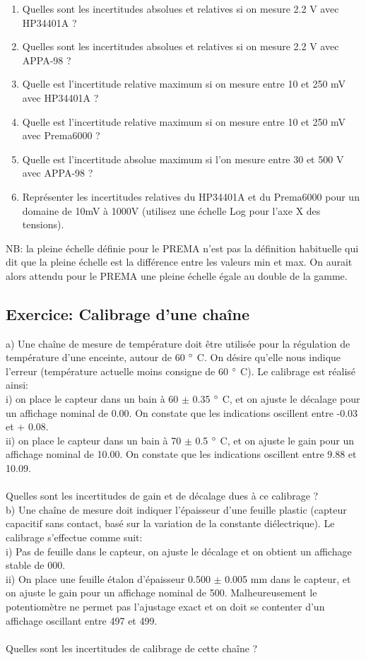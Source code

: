 \begin{enumerate}
\item Quelles sont les incertitudes absolues et relatives si on mesure 2.2 V avec HP34401A ?
\item Quelles sont les incertitudes absolues et relatives si on mesure 2.2 V avec APPA-98 ?
\item Quelle est l'incertitude relative maximum si on mesure entre 10 et 250 mV avec HP34401A ?
\item Quelle est l'incertitude relative maximum si on mesure entre 10 et 250 mV avec Prema6000 ?
\item Quelle est l'incertitude absolue maximum si l'on mesure entre 30 et 500 V avec APPA-98 ?
\item Représenter les incertitudes relatives du HP34401A et du Prema6000 pour un domaine de 10mV à 1000V (utilisez une échelle Log pour l'axe X des tensions).
\end{enumerate}
NB: la pleine échelle définie pour le PREMA n'est pas la définition habituelle qui dit que la pleine échelle est la différence entre les valeurs min et max. On aurait alors attendu pour le PREMA une pleine échelle égale au double de la gamme.

\subsection{Exercice: Calibrage d'une chaîne}
a)	Une chaîne de mesure de température doit être utilisée pour la régulation de température d'une enceinte, autour de 60 $\degree$ C. On désire qu'elle nous indique l'erreur (température actuelle moins consigne de 60 $\degree$ C). Le calibrage est réalisé ainsi: \\
i)	on place le capteur dans un bain à 60 $\pm$ 0.35 $\degree$ C, et on ajuste le décalage pour un affichage nominal de 0.00. On constate que les indications oscillent entre -0.03 et + 0.08. \\
ii)	on place le capteur dans un bain à 70 $\pm$ 0.5 $\degree$ C, et on ajuste le gain pour un affichage nominal de 10.00. On constate que les indications oscillent entre 9.88 et 10.09. \\  ~ \\
Quelles sont les incertitudes de gain et de décalage dues à ce calibrage ? \\

b)	Une chaîne de mesure doit indiquer l'épaisseur d'une feuille plastic (capteur capacitif sans contact, basé sur la variation de la constante diélectrique). Le calibrage s'effectue comme suit: \\
i)	Pas de feuille dans le capteur, on ajuste le décalage et on obtient un affichage stable de 000. \\
ii)	On place une feuille étalon d'épaisseur 0.500  $\pm$  0.005 mm dans le capteur, et on ajuste le gain pour un affichage nominal de 500. Malheureusement le potentiomètre ne permet pas l'ajustage exact et on doit se contenter d'un affichage oscillant entre 497 et 499. \\~ \\
Quelles sont les incertitudes de calibrage de cette chaîne ? \\

